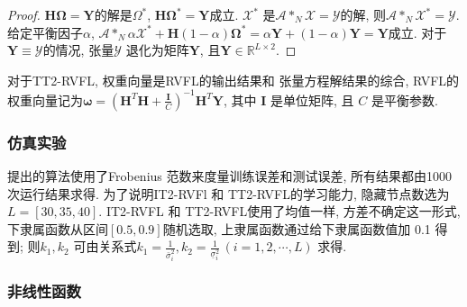 \begin{proof}
  $\bm H \bm \Omega=\bm Y$的解是$\Omega^*$, $\bm H \bm \Omega^*=\bm Y$成立.
  $\mathcal X^*$ 是$\mathcal A *_N \mathcal X=\mathcal Y$的解, 则$\mathcal A *_N \mathcal X^*=\mathcal Y$.
  给定平衡因子$\alpha$, $\mathcal A *_N  \alpha \mathcal X^*+\bm H (1-\alpha)\bm \Omega^*=\alpha \bm Y+(1-\alpha)\bm Y=\bm Y$成立.
  对于$\bm Y\equiv \mathcal Y$的情况, 张量$\mathcal Y$ 退化为矩阵$\bm Y$, 且$\bm Y\in \mathbb R^{L\times 2}$.
\end{proof}
\begin{remark}
    对于TT2-RVFL, 权重向量是RVFL的输出结果和 张量方程解结果的综合, RVFL的权重向量记为$\bm \omega=(\bm H^T \bm H+\frac {\bm I}  C)^{-1} \bm H^T \bm Y$, 其中 $\bm I$ 是单位矩阵, 且 $C$ 是平衡参数.
\end{remark}

\subsubsection{仿真实验} \label{TensorFLNsection4}
提出的算法使用了Frobenius 范数来度量训练误差和测试误差,  所有结果都由1000次运行结果求得. 为了说明IT2-RVFl 和 TT2-RVFL的学习能力, 隐藏节点数选为$L=[30,35,40]$.
IT2-RVFL 和 TT2-RVFL使用了均值一样, 方差不确定这一形式, 下隶属函数从区间$[0.5,0.9]$随机选取, 上隶属函数通过给下隶属函数值加 0.1 得到; 则$k_1, k_2$ 可由关系式$k_1=\frac{1} {\bar{\sigma} ^2_{i}}, k_2=\frac{1} {\underline{\sigma} ^2_{i}} \,(i=1,2,\cdots, L)$ 求得.
\subsubsection{非线性函数}

